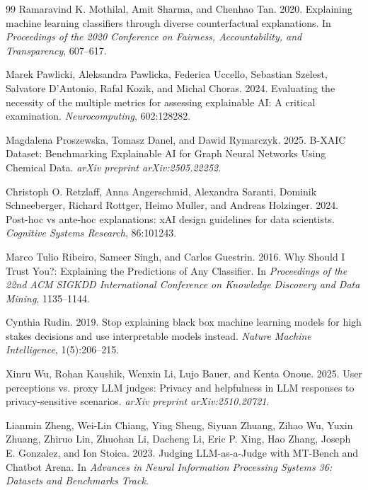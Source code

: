 \documentclass[twoside,11pt]{article}
\begin{document}
\begin{thebibliography}{99}
Ramaravind K. Mothilal, Amit Sharma, and Chenhao Tan.
2020.
Explaining machine learning classifiers through diverse counterfactual explanations.
In \emph{Proceedings of the 2020 Conference on Fairness, Accountability, and Transparency}, 607--617.

Marek Pawlicki, Aleksandra Pawlicka, Federica Uccello, Sebastian Szelest,
Salvatore D'Antonio, Rafal Kozik, and Michal Choras.
2024.
Evaluating the necessity of the multiple metrics for assessing explainable AI: A critical examination.
\emph{Neurocomputing}, 602:128282.

Magdalena Proszewska, Tomasz Danel, and Dawid Rymarczyk.
2025.
B-XAIC Dataset: Benchmarking Explainable AI for Graph Neural Networks Using Chemical Data.
\emph{arXiv preprint arXiv:2505.22252}.

Christoph O. Retzlaff, Anna Angerschmid, Alexandra Saranti, Dominik Schneeberger,
Richard Rottger, Heimo Muller, and Andreas Holzinger.
2024.
Post-hoc vs ante-hoc explanations: xAI design guidelines for data scientists.
\emph{Cognitive Systems Research}, 86:101243.

Marco Tulio Ribeiro, Sameer Singh, and Carlos Guestrin.
2016.
Why Should I Trust You?: Explaining the Predictions of Any Classifier.
In \emph{Proceedings of the 22nd ACM SIGKDD International Conference on Knowledge Discovery and Data Mining}, 1135--1144.

Cynthia Rudin.
2019.
Stop explaining black box machine learning models for high stakes decisions and use interpretable models instead.
\emph{Nature Machine Intelligence}, 1(5):206--215.

Xinru Wu, Rohan Kaushik, Wenxin Li, Lujo Bauer, and Kenta Onoue.
2025.
User perceptions vs. proxy LLM judges: Privacy and helpfulness in LLM responses to privacy-sensitive scenarios.
\emph{arXiv preprint arXiv:2510.20721}.

Lianmin Zheng, Wei-Lin Chiang, Ying Sheng, Siyuan Zhuang, Zihao Wu,
Yuxin Zhuang, Zhiruo Lin, Zhuohan Li, Dacheng Li, Eric P. Xing,
Hao Zhang, Joseph E. Gonzalez, and Ion Stoica.
2023.
Judging LLM-as-a-Judge with MT-Bench and Chatbot Arena.
In \emph{Advances in Neural Information Processing Systems 36: Datasets and Benchmarks Track}.


\end{thebibliography}
\end{document}

